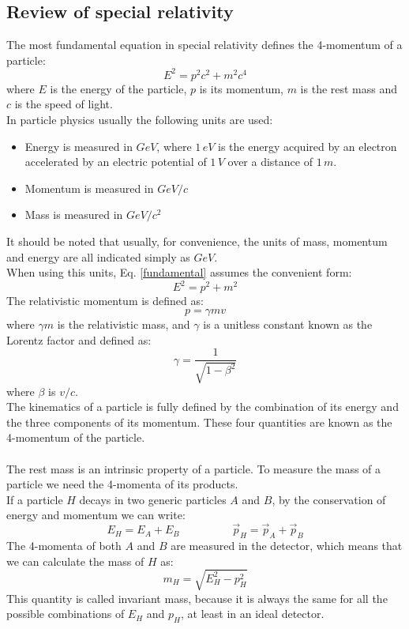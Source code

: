 \documentclass[12pt]{article}
\begin{document}
\subsection{Review of special relativity}
The most fundamental equation in special relativity defines the 4-momentum of a particle:
\begin{equation}
  E^2 = p^2c^2 + m^2c^4
\label{fundamental}
\end{equation}
where $E$ is the energy of the particle, $p$ is its momentum, $m$ is the rest mass and $c$ is the speed of 
light. \\
In particle physics usually the following units are used:
\begin{itemize}
  \item Energy is measured in $GeV$, where $1\,eV$ is the energy acquired by an electron accelerated by an
	electric potential of $1\,V$ over a distance of $1\,m$.
  \item Momentum is measured in $GeV/c$
  \item Mass is measured in $GeV/c^2$
\end{itemize}
It should be noted that usually, for convenience, the units of mass, momentum and energy are all indicated 
simply as $GeV$. \\
When using this units, Eq. \ref{fundamental} assumes the convenient form:
\begin{equation}
  E^2 = p^2 + m^2
  \label{fundamental_conv}
\end{equation}
The relativistic momentum is defined as:
\begin{equation}
  p = \gamma m v
\end{equation}
where $\gamma m$ is the relativistic mass, and $\gamma$ is a unitless constant known as the Lorentz factor
and defined as:
\begin{equation}
  \gamma = \frac{1}{\sqrt{1 - \beta^2}}
\end{equation}
where $\beta$ is $v/c$. \\
The kinematics of a particle is fully defined by the combination of its energy and the three components
of its momentum. These four quantities are known as the 4-momentum of the particle. \\ \\
The rest mass is an intrinsic property of a particle. To measure the mass of a particle we
need the 4-momenta of its products. \\
If a particle $H$ decays in two generic particles $A$ and $B$, by the conservation of energy and momentum
we can write:
$$
	E_H = E_A + E_B \hspace{2cm} \vec{p}_H = \vec{p}_A + \vec{p}_B
$$
The 4-momenta of both $A$ and $B$ are measured in the detector, which means that we can calculate the mass
of $H$ as:
\begin{equation}
  m_H = \sqrt{E^2_H - p^2_H}
\end{equation}
This quantity is called invariant mass, because it is always the same for all the possible combinations of
$E_H$ and $p_H$, at least in an ideal detector.
\end{document}
